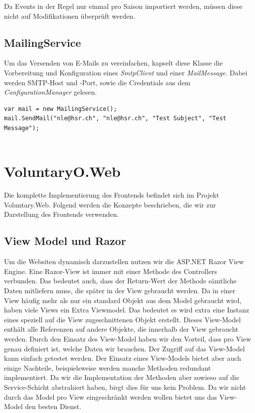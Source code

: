 	\noindent
	Da Events in der Regel nur einmal pro Saison importiert werden, müssen diese nicht auf Modifikationen überprüft werden.
	
	\subsection{MailingService}
	Um das Versenden von E-Mails zu vereinfachen, kapselt diese Klasse die Vorbereitung und Konfiguration eines \textit{SmtpClient} und einer \textit{MailMessage}. Dabei werden SMTP-Host und -Port, sowie die Credentials aus dem \textit{ConfigurationManager} gelesen.  

\begin{lstlisting}[language=CSharp, caption=Verwendung des MailingService, label=lst:mappingcontextcs, firstnumber=1]
var mail = new MailingService();
mail.SendMail("nle@hsr.ch", "nle@hsr.ch", "Test Subject", "Test Message");


    \end{lstlisting}
    



\section{VoluntaryO.Web}

	Die komplette Implementierung des Frontends befindet sich im Projekt Voluntary.Web. Folgend werden die Konzepte beschrieben, die wir zur Darstellung des Frontends verwenden.

	\subsection{View Model und Razor}
	Um die Websiten dynamisch darzustellen nutzen wir die ASP.NET Razor View Engine. Eine Razor-View ist immer mit einer Methode des Controllers verbunden. Das bedeutet auch, dass der Return-Wert der Methode sämtliche Daten mitliefern muss, die später in der View gebraucht werden. Da in einer View häufig mehr als nur ein standard Objekt aus dem Model gebraucht wird, haben viele Views ein Extra Viewmodel. Das bedeutet es wird extra eine Instanz eines speziell auf die View zugeschnittenen Objekt erstellt. Dieses View-Model enthält alle Referenzen auf andere Objekte, die innerhalb der View gebraucht werden.
	Durch den Einsatz des View-Model haben wir den Vorteil, dass pro View genau definiert ist, welche Daten wir brauchen. Der Zugriff auf das View-Model kann einfach getestet werden.
	Der Einsatz eines View-Models bietet aber auch einige Nachteile, beispielsweise werden manche Methoden redundant implementiert. Da wir die Implementation der Methoden aber sowieso auf die Service-Schicht abstrahiert haben, birgt dies für uns kein Problem.
	Da wir nicht durch das Model pro View eingeschränkt werden wollen bietet uns das View-Model den besten Dienst.

